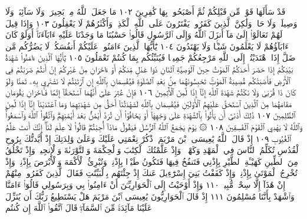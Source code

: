 قَدْ سَأَلَهَا قَوْمࣱ مِّن قَبْلِكُمْ ثُمَّ أَصْبَحُوا۟ بِهَا كَٰفِرِينَ ١٠٢ مَا جَعَلَ
ٱللَّهُ مِنۢ بَحِيرَةࣲ وَلَا سَآئِبَةࣲ وَلَا وَصِيلَةࣲ وَلَا حَامࣲ وَلَٰكِنَّ ٱلَّذِينَ
كَفَرُوا۟ يَفْتَرُونَ عَلَى ٱللَّهِ ٱلْكَذِبَۖ وَأَكْثَرُهُمْ لَا يَعْقِلُونَ ١٠٣
وَإِذَا قِيلَ لَهُمْ تَعَالَوْا۟ إِلَىٰ مَآ أَنزَلَ ٱللَّهُ وَإِلَى ٱلرَّسُولِ قَالُوا۟ حَسْبُنَا
مَا وَجَدْنَا عَلَيْهِ ءَابَآءَنَآۚ أَوَلَوْ كَانَ ءَابَآؤُهُمْ لَا يَعْلَمُونَ
شَيْـࣰٔا وَلَا يَهْتَدُونَ ١٠٤ يَٰٓأَيُّهَا ٱلَّذِينَ ءَامَنُوا۟ عَلَيْكُمْ أَنفُسَكُمْۖ
لَا يَضُرُّكُم مَّن ضَلَّ إِذَا ٱهْتَدَيْتُمْۚ إِلَى ٱللَّهِ مَرْجِعُكُمْ جَمِيعࣰا
فَيُنَبِّئُكُم بِمَا كُنتُمْ تَعْمَلُونَ ١٠٥ يَٰٓأَيُّهَا ٱلَّذِينَ ءَامَنُوا۟ شَهَٰدَةُ
بَيْنِكُمْ إِذَا حَضَرَ أَحَدَكُمُ ٱلْمَوْتُ حِينَ ٱلْوَصِيَّةِ ٱثْنَانِ ذَوَا
عَدْلࣲ مِّنكُمْ أَوْ ءَاخَرَانِ مِنْ غَيْرِكُمْ إِنْ أَنتُمْ ضَرَبْتُمْ فِي ٱلْأَرْضِ
فَأَصَٰبَتْكُم مُّصِيبَةُ ٱلْمَوْتِۚ تَحْبِسُونَهُمَا مِنۢ بَعْدِ ٱلصَّلَوٰةِ
فَيُقْسِمَانِ بِٱللَّهِ إِنِ ٱرْتَبْتُمْ لَا نَشْتَرِي بِهِۦ ثَمَنࣰا وَلَوْ كَانَ ذَا
قُرْبَىٰ وَلَا نَكْتُمُ شَهَٰدَةَ ٱللَّهِ إِنَّآ إِذࣰا لَّمِنَ ٱلْأٓثِمِينَ ١٠٦ فَإِنْ عُثِرَ
عَلَىٰٓ أَنَّهُمَا ٱسْتَحَقَّآ إِثْمࣰا فَـَٔاخَرَانِ يَقُومَانِ مَقَامَهُمَا مِنَ ٱلَّذِينَ
ٱسْتَحَقَّ عَلَيْهِمُ ٱلْأَوْلَيَٰنِ فَيُقْسِمَانِ بِٱللَّهِ لَشَهَٰدَتُنَآ أَحَقُّ مِن
شَهَٰدَتِهِمَا وَمَا ٱعْتَدَيْنَآ إِنَّآ إِذࣰا لَّمِنَ ٱلظَّٰلِمِينَ ١٠٧ ذَٰلِكَ أَدْنَىٰٓ
أَن يَأْتُوا۟ بِٱلشَّهَٰدَةِ عَلَىٰ وَجْهِهَآ أَوْ يَخَافُوٓا۟ أَن تُرَدَّ أَيْمَٰنُۢ بَعْدَ
أَيْمَٰنِهِمْۗ وَٱتَّقُوا۟ ٱللَّهَ وَٱسْمَعُوا۟ۗ وَٱللَّهُ لَا يَهْدِي ٱلْقَوْمَ ٱلْفَٰسِقِينَ ١٠٨
۞ يَوْمَ يَجْمَعُ ٱللَّهُ ٱلرُّسُلَ فَيَقُولُ مَاذَآ أُجِبْتُمْۖ قَالُوا۟ لَا عِلْمَ لَنَآۖ
إِنَّكَ أَنتَ عَلَّٰمُ ٱلْغُيُوبِ ١٠٩ إِذْ قَالَ ٱللَّهُ يَٰعِيسَى ٱبْنَ مَرْيَمَ
ٱذْكُرْ نِعْمَتِي عَلَيْكَ وَعَلَىٰ وَٰلِدَتِكَ إِذْ أَيَّدتُّكَ بِرُوحِ
ٱلْقُدُسِ تُكَلِّمُ ٱلنَّاسَ فِي ٱلْمَهْدِ وَكَهْلࣰاۖ وَإِذْ عَلَّمْتُكَ
ٱلْكِتَٰبَ وَٱلْحِكْمَةَ وَٱلتَّوْرَىٰةَ وَٱلْإِنجِيلَۖ وَإِذْ تَخْلُقُ
مِنَ ٱلطِّينِ كَهَيْـَٔةِ ٱلطَّيْرِ بِإِذْنِي فَتَنفُخُ فِيهَا فَتَكُونُ
طَيْرَۢا بِإِذْنِيۖ وَتُبْرِئُ ٱلْأَكْمَهَ وَٱلْأَبْرَصَ بِإِذْنِيۖ وَإِذْ تُخْرِجُ
ٱلْمَوْتَىٰ بِإِذْنِيۖ وَإِذْ كَفَفْتُ بَنِيٓ إِسْرَٰٓءِيلَ عَنكَ إِذْ
جِئْتَهُم بِٱلْبَيِّنَٰتِ فَقَالَ ٱلَّذِينَ كَفَرُوا۟ مِنْهُمْ إِنْ هَٰذَآ
إِلَّا سِحْرࣱ مُّبِينࣱ ١١٠ وَإِذْ أَوْحَيْتُ إِلَى ٱلْحَوَارِيِّـۧنَ أَنْ ءَامِنُوا۟
بِي وَبِرَسُولِي قَالُوٓا۟ ءَامَنَّا وَٱشْهَدْ بِأَنَّنَا مُسْلِمُونَ ١١١
إِذْ قَالَ ٱلْحَوَارِيُّونَ يَٰعِيسَى ٱبْنَ مَرْيَمَ هَلْ يَسْتَطِيعُ رَبُّكَ
أَن يُنَزِّلَ عَلَيْنَا مَآئِدَةࣰ مِّنَ ٱلسَّمَآءِۖ قَالَ ٱتَّقُوا۟ ٱللَّهَ إِن كُنتُم
